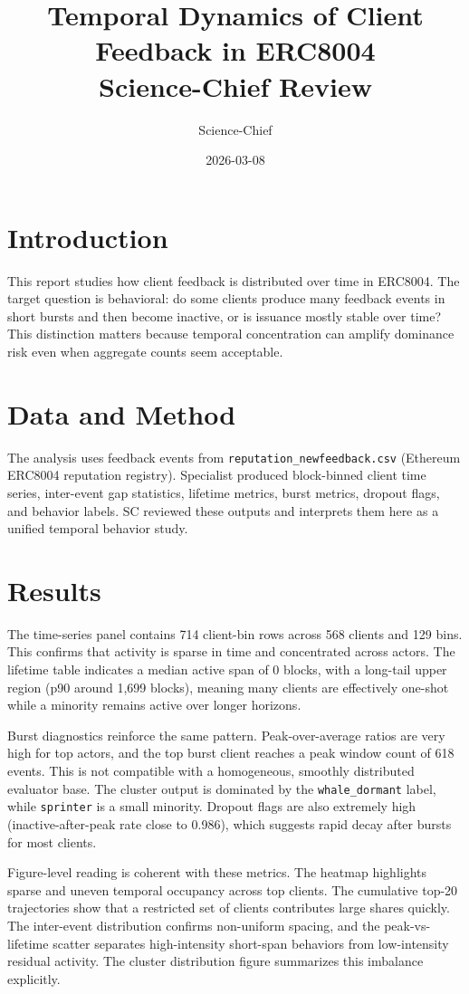 \documentclass[11pt,a4paper]{article}
\title{Temporal Dynamics of Client Feedback in ERC8004\\Science-Chief Review}
\author{Science-Chief}
\date{2026-03-08}
\begin{document}
\maketitle

\section*{Introduction}
This report studies how client feedback is distributed over time in ERC8004. The target question is behavioral: do some clients produce many feedback events in short bursts and then become inactive, or is issuance mostly stable over time? This distinction matters because temporal concentration can amplify dominance risk even when aggregate counts seem acceptable.

\section*{Data and Method}
The analysis uses feedback events from \texttt{reputation\_newfeedback.csv} (Ethereum ERC8004 reputation registry). Specialist produced block-binned client time series, inter-event gap statistics, lifetime metrics, burst metrics, dropout flags, and behavior labels. SC reviewed these outputs and interprets them here as a unified temporal behavior study.

\section*{Results}
The time-series panel contains 714 client-bin rows across 568 clients and 129 bins. This confirms that activity is sparse in time and concentrated across actors. The lifetime table indicates a median active span of 0 blocks, with a long-tail upper region (p90 around 1,699 blocks), meaning many clients are effectively one-shot while a minority remains active over longer horizons.

Burst diagnostics reinforce the same pattern. Peak-over-average ratios are very high for top actors, and the top burst client reaches a peak window count of 618 events. This is not compatible with a homogeneous, smoothly distributed evaluator base. The cluster output is dominated by the \texttt{whale\_dormant} label, while \texttt{sprinter} is a small minority. Dropout flags are also extremely high (inactive-after-peak rate close to 0.986), which suggests rapid decay after bursts for most clients.

Figure-level reading is coherent with these metrics. The heatmap highlights sparse and uneven temporal occupancy across top clients. The cumulative top-20 trajectories show that a restricted set of clients contributes large shares quickly. The inter-event distribution confirms non-uniform spacing, and the peak-vs-lifetime scatter separates high-intensity short-span behaviors from low-intensity residual activity. The cluster distribution figure summarizes this imbalance explicitly.
\end{document}
